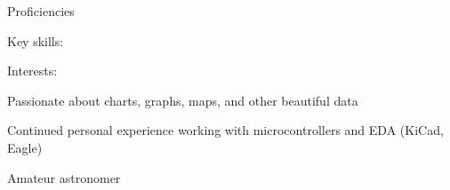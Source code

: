 \documentclass[letterpaper,12pt]{article}
\begin{document}
\begin{paracol}{2}
\begin{res_section}{Proficiencies}
\begin{res_subsection}[
    leftmargin=1.5em,
    itemindent=0em,
    labelwidth=1.5em
  ]{Key skills:}
  \end{res_subsection}
  \begin{res_subsection}[
    leftmargin=1.5em,
    itemindent=0em,
    labelwidth=1.5em
  ]{Interests:}
    \item Passionate about charts, graphs, maps, and other beautiful data\\
    \item Continued personal experience working with microcontrollers and EDA (KiCad, Eagle)
    \item Amateur astronomer
  \end{res_subsection}
\end{res_section}

\switchcolumn
  \vspace{6pt}


\end{paracol}
\end{document}
